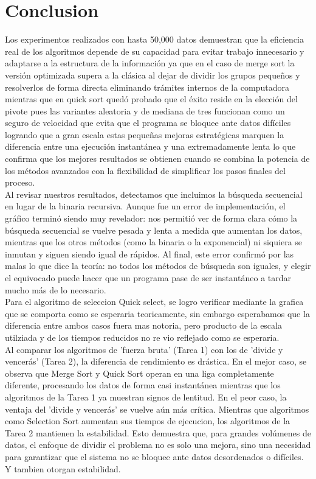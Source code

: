 \documentclass[9pt,letterpaper,onecolumn]{rho-class/rho}
\begin{document}
\newpage
\section{Conclusion}

Los experimentos realizados con hasta 50,000 datos demuestran que la eficiencia real de los algoritmos depende de su capacidad para evitar trabajo 
innecesario y adaptarse a la estructura de la información ya que en el caso de merge sort la versión optimizada supera a la clásica al dejar de dividir los 
grupos pequeños y resolverlos de forma directa eliminando trámites internos de la computadora mientras que en quick sort quedó probado que el éxito reside en la
 elección del pivote pues las variantes aleatoria y de mediana de tres funcionan como un seguro de velocidad que evita que el programa se bloquee ante datos
  difíciles logrando que a gran escala estas pequeñas mejoras estratégicas marquen la diferencia entre una ejecución instantánea y una extremadamente lenta lo 
  que confirma que los mejores resultados se obtienen cuando se combina la potencia de los métodos avanzados con la flexibilidad de simplificar los pasos finales 
  del proceso.\\
Al revisar nuestros resultados, detectamos que incluimos la búsqueda secuencial en lugar de la binaria recursiva. Aunque fue un error de implementación, 
el gráfico terminó siendo muy revelador: nos permitió ver de forma clara cómo la búsqueda secuencial se vuelve pesada y lenta a medida que aumentan los datos, 
mientras que los otros métodos (como la binaria o la exponencial) ni siquiera se inmutan y siguen siendo igual de rápidos.
Al final, este error confirmó por las malas lo que dice la teoría: no todos los métodos de búsqueda son iguales, y elegir el equivocado puede hacer que un 
programa pase de ser instantáneo a tardar mucho más de lo necesario.\\
Para el algoritmo de seleccion Quick select, se logro verificar mediante la grafica que se comporta como se esperaria teoricamente, sin embargo esperabamos que la 
diferencia entre ambos casos fuera mas notoria, pero producto de la escala utilziada y de los tiempos reducidos no re vio reflejado como se esperaria.\\
Al comparar los algoritmos de 'fuerza bruta' (Tarea 1) con los de 'divide y vencerás' (Tarea 2), la diferencia de rendimiento es drástica. En el mejor caso, 
se observa que Merge Sort y Quick Sort operan en una liga completamente diferente, procesando los datos de forma casi instantánea mientras que los algoritmos de 
la Tarea 1 ya muestran signos de lentitud.
En el peor caso, la ventaja del 'divide y vencerás' se vuelve aún más crítica. Mientras que algoritmos como Selection Sort aumentan sus tiempos
de ejecucion, los algoritmos de la Tarea 2 mantienen la estabilidad. Esto demuestra que, para grandes volúmenes de datos, el enfoque de dividir el problema no 
es solo una mejora, sino una necesidad para garantizar que el sistema no se bloquee ante datos desordenados o difíciles. Y tambien otorgan estabilidad.
\end{document}
